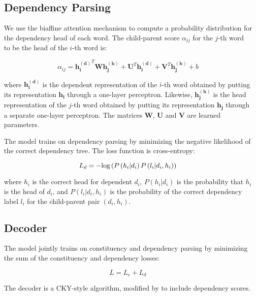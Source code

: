 \documentclass[11pt,a4paper]{article}
\begin{document}
\subsection{Dependency Parsing}

We use the biaffine attention mechanism \cite{dozat2016deep} to compute a probability distribution for the dependency head of each word. The child-parent score $\alpha_{ij}$ for the $j$-th word to be the head of the $i$-th word is:

\begin{equation}
    \alpha_{ij} = \mathbf{h_i^{(d)}}^T \mathbf{W} \mathbf{h_j^{(h)}} + \mathbf{U}^T \mathbf{h_i^{(d)}} + \mathbf{V}^T \mathbf{h_j^{(h)}} + b
\end{equation}

\noindent where $\mathbf{h_i^{(d)}}$ is the dependent representation of the $i$-th word obtained by putting its representation $\mathbf{h_i}$ through a one-layer perceptron. Likewise, $\mathbf{h_j^{(h)}}$ is the head representation of the $j$-th word obtained by putting its representation $\mathbf{h_j}$ through a separate one-layer perceptron. The matrices $\mathbf{W}$, $\mathbf{U}$ and $\mathbf{V}$ are learned parameters.

The model trains on dependency parsing by minimizing the negative likelihood of the correct dependency tree. The loss function is cross-entropy:

\begin{equation}
    L_d = - \textup{log}\left(P\left(h_i|d_i\right)P\left(l_i|d_i, h_i\right)\right)
\end{equation}

\noindent where $h_i$ is the correct head for dependent $d_i$, $P\left(h_i|d_i\right)$ is the probability that $h_i$ is the head of $d_i$, and $P\left(l_i|d_i, h_i\right)$ is the probability of the correct dependency label $l_i$ for the child-parent pair $(d_i, h_i)$.

\subsection{Decoder}

The model jointly trains on constituency and dependency parsing by minimizing the sum of the constituency and dependency losses:

\begin{equation}
    L = L_c + L_d
\end{equation}

The decoder is a CKY-style \cite{kasami1966efficient, younger1967recognition, cocke1969programming, stern2017minimal} algorithm, modified by \citet{zhou2019head} to include dependency scores.
\end{document}
